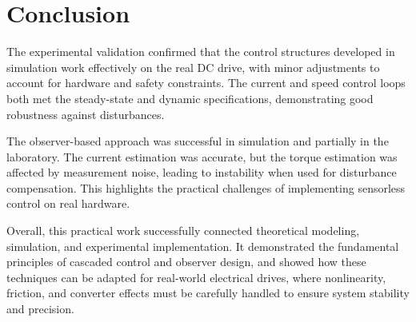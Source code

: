 \documentclass{rapportCS}
\begin{document}
\section{Conclusion}
The experimental validation confirmed that the control structures developed in simulation work effectively on the real DC drive, with minor adjustments to account for hardware and safety constraints. 
The current and speed control loops both met the steady-state and dynamic specifications, demonstrating good robustness against disturbances.

The observer-based approach was successful in simulation and partially in the laboratory. 
The current estimation was accurate, but the torque estimation was affected by measurement noise, leading to instability when used for disturbance compensation. 
This highlights the practical challenges of implementing sensorless control on real hardware.

Overall, this practical work successfully connected theoretical modeling, simulation, and experimental implementation. 
It demonstrated the fundamental principles of cascaded control and observer design, and showed how these techniques can be adapted for real-world electrical drives, where nonlinearity, friction, and converter effects must be carefully handled to ensure system stability and precision.
\end{document}
